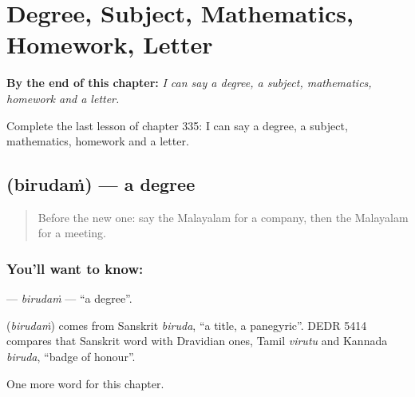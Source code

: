 
\chapter{Degree, Subject, Mathematics, Homework, Letter}
\label{ch:ml-degree-subject-mathematics-homework-letter}

\begin{chapteropening}
\textbf{By the end of this chapter:} \emph{I can say a degree, a subject, mathematics, homework and a letter.}

Complete the last lesson of chapter 335: I can say a degree, a subject, mathematics, homework and a letter.
\end{chapteropening}

\section[\texorpdfstring{\ml{ബിരുദം} (birudaṁ)}{ബിരുദം (birudaṁ)}]{ (birudaṁ) — a degree}

\label{lesson:ML-C335-birudam}



\begin{quote}
Before the new one: say the Malayalam for a company, then the Malayalam for a meeting.
\end{quote}

\subsection*{You'll want to know: }
\textbf{} — \emph{birudaṁ} — \textquotedblleft{}a degree\textquotedblright{}.

\begin{cousinweb}
\textbf{} (\emph{birudaṁ}) comes from Sanskrit \emph{biruda}, \textquotedblleft{}a title, a panegyric\textquotedblright{}. DEDR 5414 compares that Sanskrit word with Dravidian ones, Tamil \emph{virutu} and Kannada \emph{biruda}, \textquotedblleft{}badge of honour\textquotedblright{}.
\end{cousinweb}

\begin{grammarlens}[title={What you've built}]
One more word for this chapter.
\end{grammarlens}

